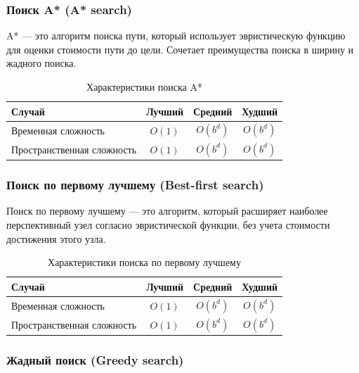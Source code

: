\documentclass[a4paper,12pt]{article}
\begin{document}
\subsubsection{Поиск A* (A* search)}
\label{subsubsec:поиск-a-a-search}

A* --- это алгоритм поиска пути, который использует эвристическую функцию для оценки стоимости пути до цели. Сочетает преимущества поиска в ширину и жадного поиска.

\begin{table}[H]
    \centering
    \begin{tabular}{|l|c|c|c|}
        \hline
        Случай & Лучший & Средний & Худший \\
        \hline
        Временная сложность & $O(1)$ & $O(b^d)$ & $O(b^d)$ \\
        \hline
        Пространственная сложность & $O(1)$ & $O(b^d)$ & $O(b^d)$ \\
        \hline
    \end{tabular}
    \caption{Характеристики поиска A*}
\end{table}

\subsubsection{Поиск по первому лучшему (Best-first search)}
\label{subsubsec:поиск-по-первому-лучшему-best-first-search}

Поиск по первому лучшему --- это алгоритм, который расширяет наиболее перспективный узел согласно эвристической функции, без учета стоимости достижения этого узла.

\begin{table}[H]
    \centering
    \begin{tabular}{|l|c|c|c|}
        \hline
        Случай & Лучший & Средний & Худший \\
        \hline
        Временная сложность & $O(1)$ & $O(b^d)$ & $O(b^d)$ \\
        \hline
        Пространственная сложность & $O(1)$ & $O(b^d)$ & $O(b^d)$ \\
        \hline
    \end{tabular}
    \caption{Характеристики поиска по первому лучшему}
\end{table}

\subsubsection{Жадный поиск (Greedy search)}
\label{subsubsec:жадный-поиск-greedy-search}
\end{document}
